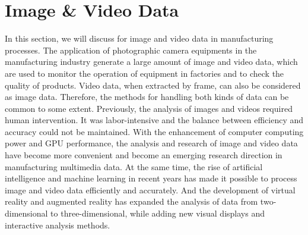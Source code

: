 \documentclass[a4paper,fleqn]{cas-dc}
\begin{document}
\section{Image \& Video Data}
In this section, we will discuss for image and video data in manufacturing processes.
The application of photographic camera equipments in the manufacturing industry generate a large amount of image and video data, which are used to monitor the operation of equipment in factories and to check the quality of products.
Video data, when extracted by frame, can also be considered as image data. Therefore, the methods for handling both kinds of data can be common to some extent.
Previously, the analysis of images and videos required human intervention. It was labor-intensive and the balance between efficiency and accuracy could not be maintained.
With the enhancement of computer computing power and GPU performance, the analysis and research of image and video data have become more convenient and become an emerging research direction in manufacturing multimedia data.
At the same time, the rise of artificial intelligence and machine learning in recent years has made it possible to process image and video data efficiently and accurately.
And the development of virtual reality and augmented reality has expanded the analysis of data from two-dimensional to three-dimensional, while adding new visual displays and interactive analysis methods.
\end{document}

